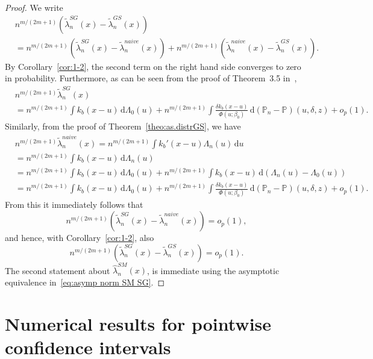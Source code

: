 \documentclass[11pt,reqno]{amsart}
\theoremstyle{definition}
\theoremstyle{plain}
\theoremstyle{remark}
\begin{document}
\begin{proof}
We write
\[
\begin{split}
&
n^{m/(2m+1)}
\left(
\tilde{\lambda}_n^{SG}(x)-\tilde{\lambda}_n^{GS}(x)
\right)\\
&=
n^{m/(2m+1)}
\left(
\tilde{\lambda}_n^{SG}(x)-\tilde{\lambda}_n^{naive}(x)
\right)
+
n^{m/(2m+1)}
\left(
\tilde{\lambda}_n^{naive}(x)-\tilde{\lambda}_n^{GS}(x)
\right).
\end{split}
\]
By Corollary~\ref{cor:1-2}, the second term on the right hand side converges to zero in probability.
Furthermore, as can be seen from the proof of Theorem~3.5 in~\cite{LopuhaaMustaSI2016},
\[
\begin{split}
&
n^{m/(2m+1)}
\tilde{\lambda}^{SG}_n(x)\\
&=
n^{m/(2m+1)}
\int k_b(x-u)\,\mathrm{d}\Lambda_0(u)
+
n^{m/(2m+1)}
\int
\frac{\delta k_b(x-u)}{\Phi(u;\beta_0)}\,\mathrm{d}({\mathbb{P}}_n-{\mathbb{P}})(u,\delta,z)+o_p(1).
\end{split}
\]
Similarly, from the proof of Theorem~\ref{theo:as.distrGS}, we have
\[
\begin{split}
&
n^{m/(2m+1)}
\tilde{\lambda}_n^{naive}(x)
=
n^{m/(2m+1)}
\int k_b'(x-u)\Lambda_n(u)\,\mathrm{d}u\\
&=
n^{m/(2m+1)}
\int k_b(x-u)\,\mathrm{d}\Lambda_n(u)\\
&=
n^{m/(2m+1)}
\int k_b(x-u)\,\mathrm{d}\Lambda_0(u)
+
n^{m/(2m+1)}
\int k_b(x-u)\,\mathrm{d}(\Lambda_n(u)-\Lambda_0(u))\\
&=
n^{m/(2m+1)}
\int k_b(x-u)\,\mathrm{d}\Lambda_0(u)
+
n^{m/(2m+1)}
\int
\frac{\delta k_b(x-u)}{\Phi(u;\beta_0)}\,\mathrm{d}({\mathbb{P}}_n-{\mathbb{P}})(u,\delta,z)+o_p(1).
\end{split}
\]
From this it immediately follows that
\[
n^{m/(2m+1)}
\left(
\tilde{\lambda}_n^{SG}(x)-\tilde{\lambda}_n^{naive}(x)
\right)
=
o_p(1),
\]
and hence, with Corollary~\ref{cor:1-2}, also
\[
n^{m/(2m+1)}
\left(
\tilde{\lambda}_n^{SG}(x)-\tilde{\lambda}_n^{GS}(x)
\right)
=
o_p(1).
\]
The second statement about $\hat{\lambda}_n^{SM}(x)$, is immediate using the asymptotic equivalence in~\eqref{eq:asymp norm SM SG}.
\end{proof}

\section{Numerical results for pointwise confidence intervals}
\label{sec:conf-int}
\end{document}
